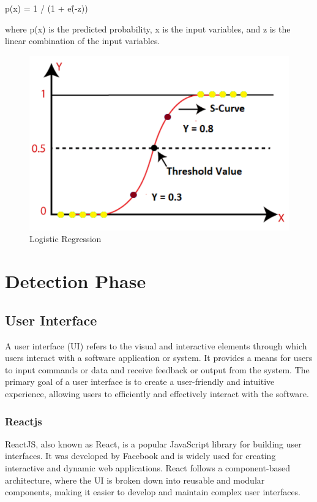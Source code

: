 p(x) = 1 / (1 + e\^(-z))

where p(x) is the predicted probability, x is the input variables, and z is the linear combination of the input variables.
\begin{figure}[H]
\centerline{\includegraphics[scale=0.8]{LRgraph.png}}
\caption{Logistic Regression}
\label{fig}
\end{figure}
\section{Detection Phase}
\subsection{User Interface}
\par A user interface (UI) refers to the visual and interactive elements through which users interact with a software application or system. It provides a means for users to input commands or data and receive feedback or output from the system. The primary goal of a user interface is to create a user-friendly and intuitive experience, allowing users to efficiently and effectively interact with the software.
\subsubsection{Reactjs}
\par ReactJS, also known as React, is a popular JavaScript library for building user interfaces. It was developed by Facebook and is widely used for creating interactive and dynamic web applications. React follows a component-based architecture, where the UI is broken down into reusable and modular components, making it easier to develop and maintain complex user interfaces.

